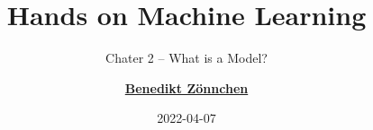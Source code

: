 \documentclass[aspectratio=169]{beamer}
\title{Hands on Machine Learning}
\subtitle{Chater 2 -- What is a Model?}
\author{\href{mailto:zoennchen.benedikt@hm.edu}{\textbf{Benedikt Z\"onnchen}}}
\date{2022-04-07}
\begin{document}
	
	\begin{frame}
		\titlepage
	\end{frame}
	
	\begin{frame}

	\end{frame}

	\begin{frame}
		
	\end{frame}


	\begin{frame}
		
	\end{frame}
	
		\begin{frame}
		
	\end{frame}
	
	\begin{frame}
		
	\end{frame}
	
	
	\begin{frame}
		
	\end{frame}

		\begin{frame}
		
	\end{frame}
	
	\begin{frame}
		
	\end{frame}
	
	
	\begin{frame}
		
	\end{frame}

		\begin{frame}
	
\end{frame}

\begin{frame}
	
\end{frame}


\begin{frame}
	
\end{frame}
\end{document}
